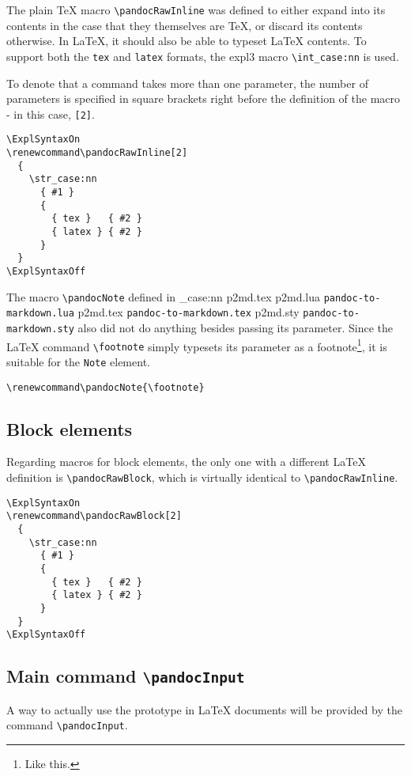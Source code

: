 \documentclass[
  digital,     %
  oneside,     %
  nosansbold,  %
  nocolorbold, %
  lof,         %
  nolot,       %
]{fithesis4}
\newcommand\macro[1]{\texttt{\textbackslash{}{#1}}}
\newcommand\file[1]
  {
    \str_case:nn
      { #1 }
      {
        { p2md.lua } { \texttt{pandoc\hyp{}to\hyp{}markdown.lua} }
        { p2md.tex } { \texttt{pandoc\hyp{}to\hyp{}markdown.tex} }
        { p2md.sty } { \texttt{pandoc\hyp{}to\hyp{}markdown.sty} }
      }
  }
\begin{document}
\noindent
The plain \TeX{} macro \macro{pandocRawInline} was defined to either expand into its contents in the case that they themselves are \TeX{}, or discard its contents otherwise. In \LaTeX{}, it should also be able to typeset \LaTeX{} contents. To support both the \texttt{tex} and \texttt{latex} formats, the expl3 macro \macro{int\_case:nn} is used.

To denote that a command takes more than one parameter, the number of parameters is specified in square brackets right before the definition of the macro - in this case, \texttt{[2]}.

\noindent
\lstset{language=[LaTeX]TeX}
\begin{lstlisting}
\ExplSyntaxOn
\renewcommand\pandocRawInline[2]
  {
    \str_case:nn
      { #1 }
      {
        { tex }   { #2 }
        { latex } { #2 }
      }
  }
\ExplSyntaxOff
\end{lstlisting}

\noindent
The macro \macro{pandocNote} defined in \file{p2md.tex} also did not do anything besides passing its parameter. Since the \LaTeX{} command \macro{footnote} simply typesets its parameter as a footnote\footnote{Like this.}, it is suitable for the \texttt{Note} element.

\noindent
\lstset{language=[LaTeX]TeX}
\begin{lstlisting}
\renewcommand\pandocNote{\footnote}
\end{lstlisting}

\subsection{Block elements}
Regarding macros for block elements, the only one with a different \LaTeX{} definition is \macro{pandocRawBlock}, which is virtually identical to \macro{pandocRawInline}.

\noindent
\lstset{language=[LaTeX]TeX}
\begin{lstlisting}
\ExplSyntaxOn
\renewcommand\pandocRawBlock[2]
  {
    \str_case:nn
      { #1 }
      {
        { tex }   { #2 }
        { latex } { #2 }
      }
  }
\ExplSyntaxOff
\end{lstlisting}

\subsection{Main command \macro{pandocInput}}
A way to actually use the prototype in \LaTeX{} documents will be provided by the command \macro{pandocInput}.
\end{document}
